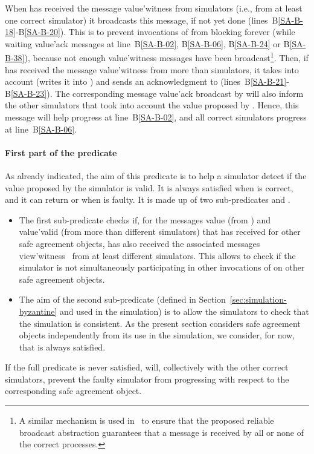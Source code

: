 \documentclass[11pt,letterpaper]{article}
\begin{document}
When  has received the message {\sc value'witness} 
from  simulators (i.e., from at least one correct simulator) it
broadcasts this message, if not yet done (lines~B\ref{SA-B-18}-B\ref{SA-B-20}).
This is to prevent  invocations of  
from blocking forever (while waiting {\sc value'ack} 
messages at line~B\ref{SA-B-02}, B\ref{SA-B-06}, B\ref{SA-B-24} or
B\ref{SA-B-38}),   because not enough {\sc value'witness}  messages
have been broadcast\footnote{A similar mechanism is used in~\cite{B87}
to ensure that the proposed reliable broadcast abstraction guarantees
that a  message is received by all or none of the correct processes.}.
Then, if   has received the message {\sc value'witness} 
from more than  simulators,
it takes  into account  (writes it into ) and sends an
acknowledgment to  (lines~B\ref{SA-B-21}-B\ref{SA-B-23}).
The corresponding message {\sc value'ack}  broadcast by 
will  also inform the other simulators  that  took  into account the
value     proposed by  . Hence,  this message  will help  
progress at line~B\ref{SA-B-02}, and all correct simulators  progress at
line~B\ref{SA-B-06}.




\paragraph{First part of the predicate }
\label{sec:def-is-valid}
As already indicated, the aim of this predicate is  to help a simulator 
detect if the value  proposed by the simulator   is valid.
It is always satisfied when    is correct, and it can return 
  or  when  is faulty. 
It is made up of two sub-predicates  and .

\begin{itemize}
\vspace{-0.2cm}
\item
The first sub-predicate  
checks if, for the messages {\sc value}  (from ) and 
{\sc value'valid}  (from more than  different simulators) 
that  has  received for other safe agreement objects,   has also 
received the associated messages {\sc view'witness}~ 
from at least  different simulators.
This allows  to check if the simulator  is not
simultaneously  participating in other invocations of 
on  other safe agreement  objects.
\vspace{-0.2cm}
\item
The aim of the second  sub-predicate  (defined in
Section~\ref{sec:simulation-byzantine} and used in the simulation) is 
to allow the simulators to check that the simulation is consistent.
As  the present section considers safe agreement objects independently 
from its use in the simulation, we consider, for now,
 that  is always satisfied.
\end{itemize}
If the full predicate  is never satisfied,  
 will, collectively with the other correct simulators,
prevent the faulty simulator  from progressing
with respect to the corresponding safe agreement object.
\end{document}
